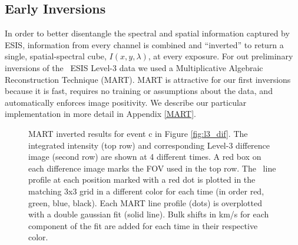     
    
    \subsection{Early Inversions} \label{sec:inversions}
    	In order to better disentangle the spectral and spatial information captured by ESIS, information from every channel is combined and ``inverted'' to return a single, spatial-spectral cube, $I(x,y,\lambda)$, at every exposure.
    	For out preliminary inversions of the \ov \  ESIS Level-3 data we used a Multiplicative Algebraic Reconstruction Technique (MART).
    	MART is attractive for our first inversions because it is fast, requires no training or assumptions about the data, and automatically enforces image  positivity.
    	We describe our particular implementation in more detail in Appendix \ref{MART}.
    	
    	\begin{figure}[htb!]
    		\centering
    		\caption{MART inverted results for event c in Figure \ref{fig:l3_dif}. The integrated intensity (top row) and corresponding Level-3 difference image (second row) are shown at 4 different times. A red box on each difference image marks the FOV used in the top row.  The \ov \ line profile at each position marked with a red dot is plotted in the matching 3x3 grid in a different color for each time (in order red, green, blue, black). Each MART line profile (dots) is overplotted with a double gaussian fit (solid line).  Bulk shifts in km/s for each component of the fit are added for each time in their respective color. }
    		\label{fig:perfect_x_inverted}
    	\end{figure}
        
